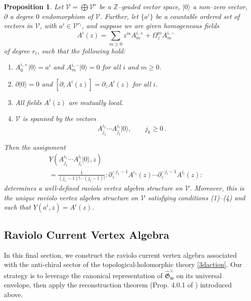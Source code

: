 \documentclass[11pt]{amsart}
\newcommand{\fG}{\mathfrak{G}}
\numberwithin{equation}{section}
\numberwithin{figure}{section}
\numberwithin{table}{section}
\theoremstyle{thm}
\newtheorem{prop}[theorem]{Proposition}
\numberwithin{equation}{subsection}
\theoremstyle{definition}
\theoremstyle{rem}
\begin{document}
\begin{prop}
\label{prop:rectheorem}
Let $\mathcal V = \bigoplus \mathcal V^r$ be a $\mathbb Z$--graded vector space, 
$|0\rangle$ a non--zero vector, $\partial$ a degree $0$ endomorphism of $\mathcal V$. 
Further, let $\{a^i\}$ be a countable ordered set of vectors in $\mathcal V$, 
with $a^i \in \mathcal V^{r_i}$, and suppose we are given homogeneous fields
\begin{equation}
    A^i(z) = \sum_{m\geq 0} z^{m} A^{i,+}_m +  \Omega^m_z A^{i,-}_m
\end{equation}
of degree $r_i$, such that the following hold:
\begin{enumerate}
    \item $A^{i,+}_{0}|0\rangle = a^i$ and $A^{i,-}_m |0\rangle = 0$ for all $i$ and $m \geq 0$.
    \item $\partial |0\rangle = 0$ and $[\partial, A^i(z)] = \partial_z A^i(z)$ for all $i$.
    \item All fields $A^i(z)$ are mutually local.
    \item $\mathcal V$ is spanned by the vectors
    \begin{equation}
        A^{i_1}_{j_1} \cdots A^{i_l}_{j_l} |0\rangle, \qquad j_k \geq 0\,.
    \end{equation}
\end{enumerate}
Then the assignment
\begin{multline}
   Y\!\left(A^{i_1}_{j_1}\cdots A^{i_l}_{j_l}|0\rangle, z\right) \\
= \frac{1}{(j_1-1)! \cdots (j_l-1)!} 
:\partial_z^{-j_1-1} A^{i_1}(z) \cdots \partial_z^{-j_l-1} A^{i_l}(z): 
\end{multline}
determines a well-defined raviolo vertex algebra structure on $\mathcal V$. 
Moreover, this is the unique raviolo vertex algebra structure on $\mathcal V$ 
satisfying conditions (1)--(4) and such that $Y(a^i, z) = A^i(z)$.
\end{prop}


    



\subsection{Raviolo Current Vertex Algebra}

In this final section, we construct the raviolo current vertex algebra associated with the anti-chiral sector of the topological-holomorphic theory \eqref{3daction}. 
Our strategy is to leverage the canonical representation of $\widehat{\fG}_{\mathfrak{w}}^\vee$ on its universal envelope, then apply the reconstruction theorem (Prop. 4.0.1 of \cite{Garner:2023zqn}) introduced above. 
\end{document}
